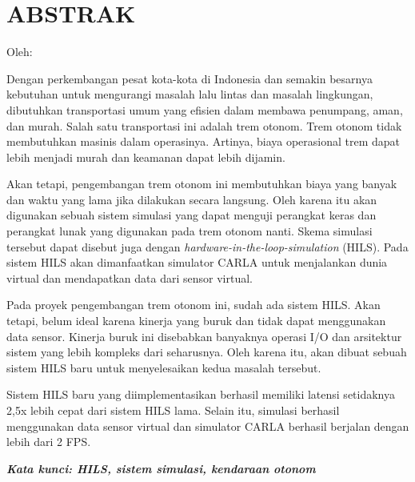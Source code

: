 \chapter*{ABSTRAK}

\begin{center}
	\bfseries \MakeUppercase{\thetitle}

	\normalfont\normalsize
	Oleh:

	\theauthor
\end{center}

\begin{singlespace}
	Dengan perkembangan pesat kota-kota di Indonesia dan semakin besarnya
	kebutuhan untuk mengurangi masalah lalu lintas dan masalah lingkungan,
	dibutuhkan transportasi umum yang efisien dalam membawa penumpang, aman, dan
	murah. Salah satu transportasi ini adalah trem otonom. Trem otonom tidak
	membutuhkan masinis dalam operasinya. Artinya, biaya operasional trem dapat
	lebih menjadi murah dan keamanan dapat lebih dijamin.

	Akan tetapi, pengembangan trem otonom ini membutuhkan biaya yang banyak dan
	waktu yang lama jika dilakukan secara langsung. Oleh karena itu akan
	digunakan sebuah sistem simulasi yang dapat menguji perangkat keras dan
	perangkat lunak yang digunakan pada trem otonom nanti. Skema simulasi
	tersebut dapat disebut juga dengan \textit{hardware-in-the-loop-simulation}
	(HILS). Pada sistem HILS akan dimanfaatkan simulator CARLA untuk menjalankan
	dunia virtual dan mendapatkan data dari sensor virtual.

	Pada proyek pengembangan trem otonom ini, sudah ada sistem HILS. Akan
	tetapi, belum ideal karena kinerja yang buruk dan tidak dapat menggunakan
	data sensor. Kinerja buruk ini disebabkan banyaknya operasi I/O dan
	arsitektur sistem yang lebih kompleks dari seharusnya. Oleh karena itu,
	akan dibuat sebuah sistem HILS baru untuk menyelesaikan kedua masalah
	tersebut.

	Sistem HILS baru yang diimplementasikan berhasil memiliki latensi setidaknya
	2,5x lebih cepat dari sistem HILS lama. Selain itu, simulasi berhasil
	menggunakan data sensor virtual dan simulator CARLA berhasil berjalan dengan
	lebih dari 2 FPS.

	\textbf{\textit{Kata kunci: HILS, sistem simulasi, kendaraan otonom}}
\end{singlespace}
\clearpage